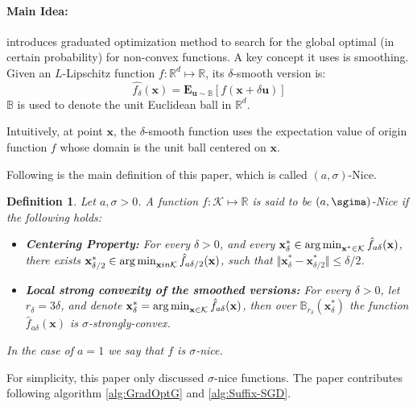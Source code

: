 \paragraph{Main Idea:}
\cite{Hazan2015} introduces  graduated optimization method to search for the global optimal (in certain probability) for non-convex functions. A key concept it uses is smoothing. Given an $L$-Lipschitz function $f: \mathbb{R}^d \mapsto \mathbb{R}$, its $\delta$-smooth version is:
$$
\hat{f_\delta}(\mathbf{x}) = \mathbf{E}_{\mathbf{u}\sim\mathbb{B}}[f(\mathbf{x}+\delta\mathbf{u})]
$$
$\mathbb{B}$ is used to denote the unit Euclidean ball in $\mathbb{R}^d$. 

Intuitively, at point $\mathbf{x}$, the $\delta$-smooth function uses the expectation value of origin function $f$ whose domain is the unit ball centered on $\mathbf{x}$.

Following is the main definition of this paper, which is called $(a, \sigma)$-Nice.
\newtheorem{sigma-Nice}{Definition}
\begin{sigma-Nice}
Let $a, \sigma > 0$. A function $f: \mathcal{K} \mapsto \mathbb{R}$ is said to be $(a, \sgima)$-Nice if the following holds:
\begin{itemize}
    \item \textbf{Centering Property:} For every $\delta > 0$, and every $\mathbf{x}^*_\delta \in \operatorname*{arg\,min}_{\mathbf{x}^* \in \mathcal{K}} \hat{f}_{a\delta}(\mathbf{x})$, there exists $\mathbf{x}^*_{\delta/2} \in \operatorname*{arg\,min}_{\mathbf{x} in \mathcal{K}} \hat{f}_{a\delta/2}(\mathbf{x})$, such that $\Vert\mathbf{x}^*_{\delta} - \mathbf{x}^*_{\delta/2}\Vert \leq \delta/2$.
    \item \textbf{Local strong convexity of the smoothed versions:} For every $\delta > 0 $, let $r_\delta = 3\delta$, and denote $\mathbf{x}^*_{\delta} = \operatorname*{arg\,min}_{\mathbf{x} \in \mathcal{K}} \hat{f}_{a\delta}(\mathbf{x})$, then over $\mathbb{B}_{r_\delta}(\mathbf{x}^*_{\delta})$ the function $\hat{f}_{a\delta}(\mathbf{x})$ is $\sigma$-strongly-convex.
\end{itemize}
In the case of $a=1$ we say that $f$ is $\sigma$-nice.
\end{sigma-Nice}

For simplicity, this paper only discussed $\sigma$-nice functions. The paper contributes following algorithm \ref{alg:GradOptG} and \ref{alg:Suffix-SGD}.

